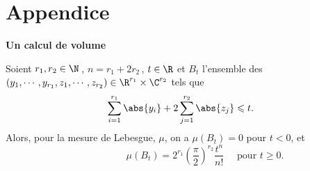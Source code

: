 \documentclass[11pt, %
  title in boldface,
  theorem in new line,
  theorem numbering = section,
  number theorems separately,
  simple name,
]{beaulivre}
\begin{document}
\section*{Appendice}

\enlargethispage*{0pt}
\medskip
    \begin{flushleft}
        \textbf{Un calcul de volume}
    \end{flushleft}
\medskip

    \begin{proposition*}
        Soient \( r_1, r_2 \in \N \)\,, \( n = r_1+2r_2 \)\,, \( t \in \R \) et \( B_t \) l'ensemble des \( (y_1, \cdots, y_{r_1}, z_1, \cdots, z_{r_2}) \in \R^{r_1} \times \C^{r_2} \) tels que
        \begin{equation}\label{eq:prop;Minkowski;aux1'}
            \sum_{i=1}^{r_1} \abs{y_i} + 2 \sum_{j=1}^{r_2} \abs{z_j} \leqslant t.
        \end{equation}
        Alors, pour la mesure de Lebesgue, \( \mu \), on a \( \mu(B_t) = 0 \) pour \( t < 0 \), et
        \begin{equation}\label{eq:prop;Minkowski;aux2'}\hspace{5em}
            \mu(B_t) = 2^{r_1} \left(\frac{\pi}{2}\right)^{r_2} \frac{t^n}{n!} \quad \text{ pour } t \geqslant 0.
        \end{equation}
    \end{proposition*}
\end{document}
